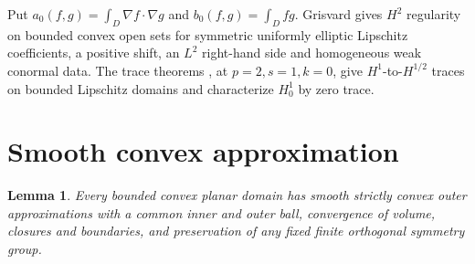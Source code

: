 \documentclass[11pt]{article}
\newtheorem{lemma}[theorem]{Lemma}
\theoremstyle{definition}
\theoremstyle{remark}
\numberwithin{equation}{section}
\begin{document}
Put $a_0(f,g)=\int_D\nabla f\cdot\nabla g$ and $b_0(f,g)=\int_Dfg$.
Grisvard \cite[Theorem~3.2.1.3, pp.~149--150]{Grisvard} gives $H^2$ regularity on bounded convex open sets for symmetric uniformly elliptic Lipschitz coefficients, a positive shift, an $L^2$ right-hand side and homogeneous weak conormal data. The trace theorems \cite[Theorems~1.5.1.3 and 1.5.1.5, p.~38]{Grisvard}, at $p=2,s=1,k=0$, give $H^1$-to-$H^{1/2}$ traces on bounded Lipschitz domains and characterize $H^1_0$ by zero trace.


\section{Smooth convex approximation}\label{sec:approx}
\begin{lemma}\label{lem:approx}
Every bounded convex planar domain has smooth strictly convex outer approximations with a common inner and outer ball, convergence of volume, closures and boundaries, and preservation of any fixed finite orthogonal symmetry group.
\end{lemma}
\end{document}
